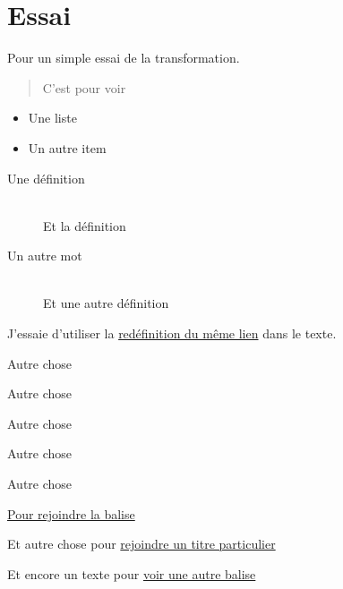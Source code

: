 % 
% 
% 
% 
% 
% 
% 
% 

\chapter{Essai}\hypertarget{essai}{}\label{essai}


Pour un simple essai de la transformation.

\begin{quote}
C'est pour voir
\end{quote}

\begin{itemize}
\item Une liste
\item Un autre item
\end{itemize}

\begin{description}
\item[Une définition] \hfill \\
 Et la définition



\item[Un autre mot] \hfill \\
 Et une autre définition
\end{description}

J'essaie d'utiliser la \href{http://laboiteaoutilsdelauteur.fr/analyse/31/show}{redéfinition du même lien} dans le texte.

Autre chose

Autre chose

Autre chose

Autre chose

Autre chose

\hyperlink{pour-voir-la-balise}{Pour rejoindre la balise }

Et autre chose pour \hyperlink{specific-id-pour-essai}{rejoindre un titre particulier}

Et encore un texte pour \hyperlink{pour-voir-une-autre-balise}{voir une autre balise}


